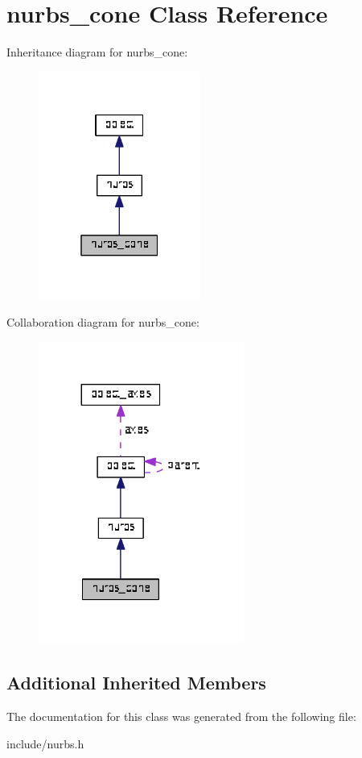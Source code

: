 \hypertarget{classnurbs__cone}{}\section{nurbs\+\_\+cone Class Reference}
\label{classnurbs__cone}


Inheritance diagram for nurbs\+\_\+cone\+:\nopagebreak
\begin{figure}[H]
\begin{center}
\leavevmode
\includegraphics[width=151pt]{classnurbs__cone__inherit__graph}
\end{center}
\end{figure}


Collaboration diagram for nurbs\+\_\+cone\+:\nopagebreak
\begin{figure}[H]
\begin{center}
\leavevmode
\includegraphics[width=191pt]{classnurbs__cone__coll__graph}
\end{center}
\end{figure}
\subsection*{Additional Inherited Members}


The documentation for this class was generated from the following file\+:\begin{DoxyCompactItemize}
\item 
include/nurbs.\+h\end{DoxyCompactItemize}
